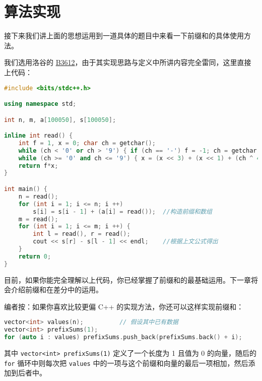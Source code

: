 \chapter{算法实现}
接下来我们讲上面的思想运用到一道具体的题目中来看一下前缀和的具体使用方法。\par
{}\par
我们选用洛谷的 \href{https://www.luogu.com.cn/problem/B3612}{B3612}，由于其实现思路与定义中所讲内容完全雷同，这里直接上代码：\par
\begin{lstlisting}[language=cpp]
#include <bits/stdc++.h>

using namespace std;

int n, m, a[100050], s[100050];

inline int read() {
    int f = 1, x = 0; char ch = getchar();
    while (ch < '0' or ch > '9') { if (ch == '-') f = -1; ch = getchar(); }
    while (ch >= '0' and ch <= '9') { x = (x << 3) + (x << 1) + (ch ^ 48); ch = getchar(); }
    return f*x;
}

int main() {
    n = read();
    for (int i = 1; i <= n; i ++)
        s[i] = s[i - 1] + (a[i] = read());	//构造前缀和数组
    m = read();
    for (int i = 1; i <= m; i ++) {
        int l = read(), r = read();
        cout << s[r] - s[l - 1] << endl;	//根据上文公式得出
    }
    return 0;
}
\end{lstlisting}
目前，如果你能完全理解以上代码，你已经掌握了前缀和的最基础运用。下一章将会介绍前缀和在差分中的运用。\par
编者按：如果你喜欢比较更偏 C++ 的实现方法，你还可以这样实现前缀和：\par
\begin{lstlisting}[language=cpp]
vector<int> values(n);			// 假设其中已有数据
vector<int> prefixSums(1);
for (auto i : values) prefixSums.push_back(prefixSums.back() + i);
\end{lstlisting}
其中 \verb!vector<int> prefixSums(1)! 定义了一个长度为 1 且值为 0 的向量，随后的 \verb!for! 循环中则每次把 \verb!values! 中的一项与这个前缀和向量的最后一项相加，然后添加到后者中。\par
